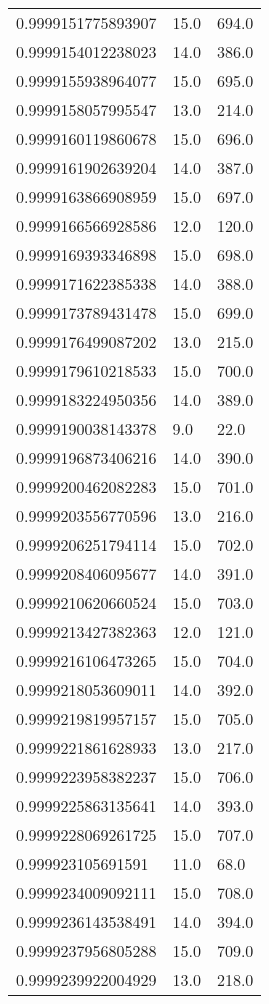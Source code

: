 \begin{center}
\begin{supertabular}[H]{p{0.30\textwidth}p{0.05\textwidth}p{0.05\textwidth}}
0.9999151775893907 & 15.0 & 694.0 \\ 
0.9999154012238023 & 14.0 & 386.0 \\ 
0.9999155938964077 & 15.0 & 695.0 \\ 
0.9999158057995547 & 13.0 & 214.0 \\ 
0.9999160119860678 & 15.0 & 696.0 \\ 
0.9999161902639204 & 14.0 & 387.0 \\ 
0.9999163866908959 & 15.0 & 697.0 \\ 
0.9999166566928586 & 12.0 & 120.0 \\ 
0.9999169393346898 & 15.0 & 698.0 \\ 
0.9999171622385338 & 14.0 & 388.0 \\ 
0.9999173789431478 & 15.0 & 699.0 \\ 
0.9999176499087202 & 13.0 & 215.0 \\ 
0.9999179610218533 & 15.0 & 700.0 \\ 
0.9999183224950356 & 14.0 & 389.0 \\ 
0.9999190038143378 & 9.0 & 22.0 \\ 
0.9999196873406216 & 14.0 & 390.0 \\ 
0.9999200462082283 & 15.0 & 701.0 \\ 
0.9999203556770596 & 13.0 & 216.0 \\ 
0.9999206251794114 & 15.0 & 702.0 \\ 
0.9999208406095677 & 14.0 & 391.0 \\ 
0.9999210620660524 & 15.0 & 703.0 \\ 
0.9999213427382363 & 12.0 & 121.0 \\ 
0.9999216106473265 & 15.0 & 704.0 \\ 
0.9999218053609011 & 14.0 & 392.0 \\ 
0.9999219819957157 & 15.0 & 705.0 \\ 
0.9999221861628933 & 13.0 & 217.0 \\ 
0.9999223958382237 & 15.0 & 706.0 \\ 
0.9999225863135641 & 14.0 & 393.0 \\ 
0.9999228069261725 & 15.0 & 707.0 \\ 
0.999923105691591 & 11.0 & 68.0 \\ 
0.9999234009092111 & 15.0 & 708.0 \\ 
0.9999236143538491 & 14.0 & 394.0 \\ 
0.9999237956805288 & 15.0 & 709.0 \\ 
0.9999239922004929 & 13.0 & 218.0 \\ 

\end{supertabular}
\end{center}

